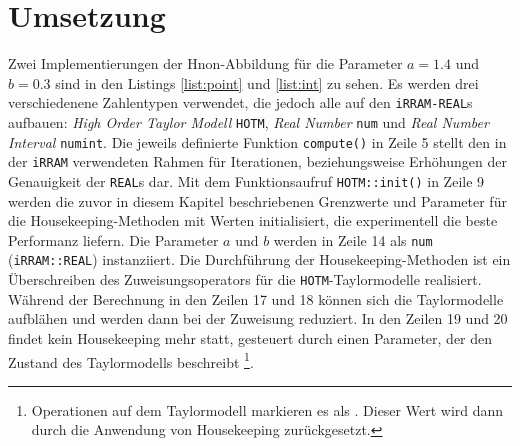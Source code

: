  \newpage
 \section{Umsetzung}
 \label{ch:umsetung}
 Zwei Implementierungen der H\e non-Abbildung für die Parameter $a=1.4$ und $b=0.3$ sind in den Listings \ref{list:point} und \ref{list:int} zu sehen. Es werden drei verschiedenene Zahlentypen verwendet, die jedoch alle auf den \verb+iRRAM-REAL+s aufbauen: \textit{High Order Taylor Modell} \verb+HOTM+, \textit{Real Number} \verb+num+ und \textit{Real Number Interval} \verb+numint+. Die jeweils definierte Funktion \verb+compute()+ in Zeile 5 stellt den in der \verb+iRRAM+ verwendeten Rahmen für Iterationen, beziehungsweise Erhöhungen der Genauigkeit der \verb+REAL+s dar. Mit dem Funktionsaufruf \verb+HOTM::init()+ in Zeile 9 werden die zuvor in diesem Kapitel beschriebenen Grenzwerte und Parameter für die Housekeeping-Methoden mit Werten initialisiert, die experimentell die beste Performanz liefern. Die Parameter $a$ und $b$ werden in Zeile 14 als \verb+num+ (\verb+iRRAM::REAL+) instanziiert. Die Durchführung der Housekeeping-Methoden ist ein Überschreiben des Zuweisungsoperators \anf{=} für die \verb+HOTM+-Taylormodelle realisiert. Während der Berechnung in den Zeilen 17 und 18 können sich die Taylormodelle aufblähen und werden dann bei der Zuweisung reduziert. In den Zeilen 19 und 20 findet kein Housekeeping mehr statt, gesteuert durch einen Parameter, der den Zustand des Taylormodells beschreibt \footnote{Operationen auf dem Taylormodell markieren es als . Dieser Wert wird dann durch die Anwendung von Housekeeping zurückgesetzt.}.
 
